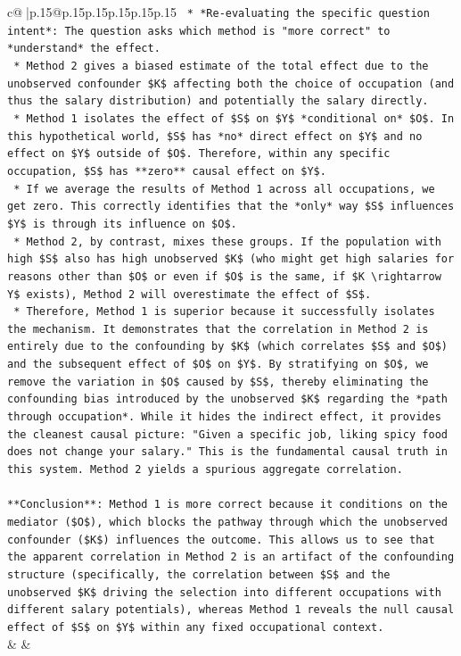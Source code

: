 \documentclass{article}
\begin{document}
{\begin{supertabular}{c@{$\;$}|p{.15\linewidth}@{}p{.15\linewidth}p{.15\linewidth}p{.15\linewidth}p{.15\linewidth}p{.15\linewidth}}
{{{\texttt{    *   *Re{-}evaluating the specific question intent*: The question asks which method is "more correct" to *understand* the effect.} \\
\texttt{        *   Method 2 gives a biased estimate of the total effect due to the unobserved confounder \$K\$ affecting both the choice of occupation (and thus the salary distribution) and potentially the salary directly.} \\
\texttt{        *   Method 1 isolates the effect of \$S\$ on \$Y\$ *conditional on* \$O\$. In this hypothetical world, \$S\$ has *no* direct effect on \$Y\$ and no effect on \$Y\$ outside of \$O\$. Therefore, within any specific occupation, \$S\$ has **zero** causal effect on \$Y\$.} \\
\texttt{        *   If we average the results of Method 1 across all occupations, we get zero. This correctly identifies that the *only* way \$S\$ influences \$Y\$ is through its influence on \$O\$.} \\
\texttt{        *   Method 2, by contrast, mixes these groups. If the population with high \$S\$ also has high unobserved \$K\$ (who might get high salaries for reasons other than \$O\$ or even if \$O\$ is the same, if \$K \textbackslash{}rightarrow Y\$ exists), Method 2 will overestimate the effect of \$S\$.} \\
\texttt{        *   Therefore, Method 1 is superior because it successfully isolates the mechanism. It demonstrates that the correlation in Method 2 is entirely due to the confounding by \$K\$ (which correlates \$S\$ and \$O\$) and the subsequent effect of \$O\$ on \$Y\$. By stratifying on \$O\$, we remove the variation in \$O\$ caused by \$S\$, thereby eliminating the confounding bias introduced by the unobserved \$K\$ regarding the *path through occupation*. While it hides the indirect effect, it provides the cleanest causal picture: "Given a specific job, liking spicy food does not change your salary." This is the fundamental causal truth in this system. Method 2 yields a spurious aggregate correlation.} \\
\\ 
\texttt{**Conclusion**: Method 1 is more correct because it conditions on the mediator (\$O\$), which blocks the pathway through which the unobserved confounder (\$K\$) influences the outcome. This allows us to see that the apparent correlation in Method 2 is an artifact of the confounding structure (specifically, the correlation between \$S\$ and the unobserved \$K\$ driving the selection into different occupations with different salary potentials), whereas Method 1 reveals the null causal effect of \$S\$ on \$Y\$ within any fixed occupational context.} \\
            }
        }
    }
    & & \\ \\


\end{supertabular}}
\end{document}
